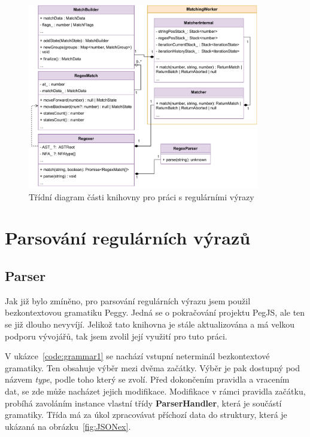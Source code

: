 
\begin{figure}[!h]
	\centering
	\includegraphics[width=0.9\textwidth]{Figures/UML_RGXR.pdf}
	\caption{Třídní diagram části knihovny pro práci s regulárními výrazy}
	\label{fig:ARCH_RGXR}
\end{figure} 

\section{Parsování regulárních výrazů}\label{sec:Parse}

\subsection*{Parser}

Jak již bylo zmíněno, pro parsování regulárních výrazu jsem použil bezkontextovou gramatiku Peggy.
Jedná se o pokračování projektu PegJS, ale ten se již dlouho nevyvíjí. 
Jelikož tato knihovna je stále aktualizována a má velkou podporu vývojářů, tak jsem zvolil její využití pro tuto práci.

V ukázce~\ref{code:grammar1} se nachází vstupní neterminál bezkontextové gramatiky. 
Ten obsahuje výběr mezi dvěma začátky.
Výběr je pak dostupný pod názvem \textit{type}, podle toho který se zvolí.
Před dokončením pravidla a vracením dat, se zde může nacházet jejich modifikace.
Modifikace v rámci pravidla začátku, probíhá zavoláním instance vlastní třídy \textbf{ParserHandler}, která je součástí gramatiky.
Třída má za úkol zpracovávat příchozí data do struktury, která je ukázaná na obrázku~\ref{fig:JSONex}.

